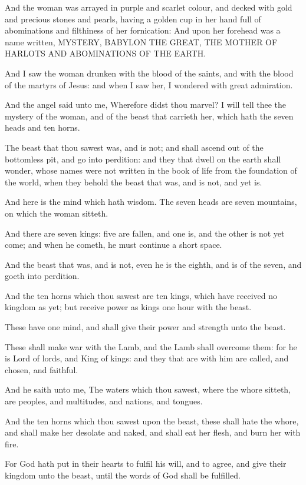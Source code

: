 \Verse And the woman was arrayed in purple and scarlet colour, and decked with gold and precious stones and pearls, having a golden cup in her hand full of abominations and filthiness of her fornication: \Verse And upon her forehead was a name written, MYSTERY, BABYLON THE GREAT, THE MOTHER OF HARLOTS AND ABOMINATIONS OF THE EARTH.

\Verse And I saw the woman drunken with the blood of the saints, and with the blood of the martyrs of Jesus: and when I saw her, I wondered with great admiration.

\Verse And the angel said unto me, Wherefore didst thou marvel? I will tell thee the mystery of the woman, and of the beast that carrieth her, which hath the seven heads and ten horns.

\Verse The beast that thou sawest was, and is not; and shall ascend out of the bottomless pit, and go into perdition: and they that dwell on the earth shall wonder, whose names were not written in the book of life from the foundation of the world, when they behold the beast that was, and is not, and yet is.

\Verse And here is the mind which hath wisdom. The seven heads are seven mountains, on which the woman sitteth.

\Verse And there are seven kings: five are fallen, and one is, and the other is not yet come; and when he cometh, he must continue a short space.

\Verse And the beast that was, and is not, even he is the eighth, and is of the seven, and goeth into perdition.

\Verse And the ten horns which thou sawest are ten kings, which have received no kingdom as yet; but receive power as kings one hour with the beast.

\Verse These have one mind, and shall give their power and strength unto the beast.

\Verse These shall make war with the Lamb, and the Lamb shall overcome them: for he is Lord of lords, and King of kings: and they that are with him are called, and chosen, and faithful.

\Verse And he saith unto me, The waters which thou sawest, where the whore sitteth, are peoples, and multitudes, and nations, and tongues.

\Verse And the ten horns which thou sawest upon the beast, these shall hate the whore, and shall make her desolate and naked, and shall eat her flesh, and burn her with fire.

\Verse For God hath put in their hearts to fulfil his will, and to agree, and give their kingdom unto the beast, until the words of God shall be fulfilled.

